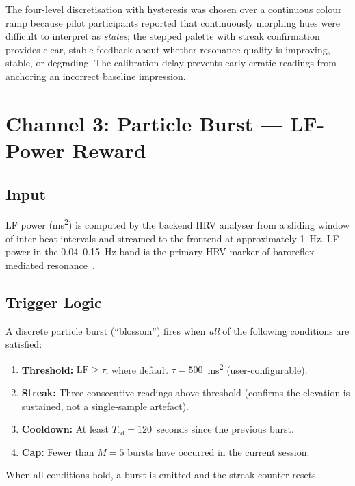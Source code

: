 \documentclass[11pt,a4paper]{article}
\begin{document}
The four-level discretisation with hysteresis was chosen over a continuous
colour ramp because pilot participants reported that continuously morphing hues
were difficult to interpret as \textit{states}; the stepped palette with streak
confirmation provides clear, stable feedback about whether resonance quality is
improving, stable, or degrading. The calibration delay prevents early erratic
readings from anchoring an incorrect baseline impression.

\section{Channel 3: Particle Burst — LF-Power Reward}

\subsection{Input}
LF power (ms\textsuperscript{2}) is computed by the backend HRV analyser from
a sliding window of inter-beat intervals and streamed to the frontend at
approximately 1~Hz. LF power in the 0.04--0.15~Hz band is the primary HRV
marker of baroreflex-mediated resonance~\cite{lehrer2014}.

\subsection{Trigger Logic}

A discrete particle burst (``blossom'') fires when \textit{all} of the
following conditions are satisfied:

\begin{enumerate}
  \item \textbf{Threshold:} $\text{LF} \geq \tau$, where default
    $\tau = 500$~ms\textsuperscript{2} (user-configurable).
  \item \textbf{Streak:} Three consecutive readings above threshold
    (confirms the elevation is sustained, not a single-sample artefact).
  \item \textbf{Cooldown:} At least $T_{\text{cd}} = 120$~seconds since
    the previous burst.
  \item \textbf{Cap:} Fewer than $M = 5$ bursts have occurred in the
    current session.
\end{enumerate}

When all conditions hold, a burst is emitted and the streak counter resets.
\end{document}
